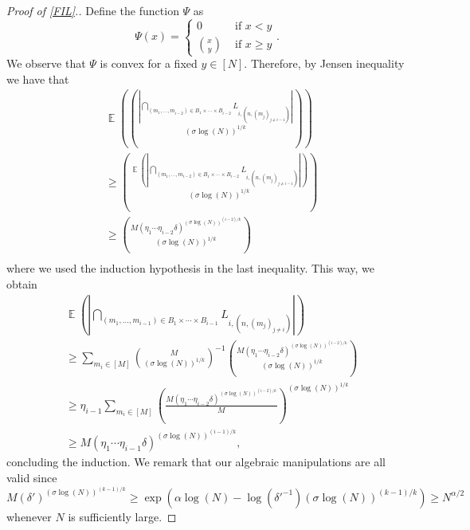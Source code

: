 \documentclass[10pt,a4paper]{amsart}
\newcommand{\E}{\operatorname{\mathbb{E}}}
\begin{document}
\begin{proof}[Proof of \cref{FIL}.]
    Define the function $\Psi$ as
    $$
    \Psi(x) =\begin{cases}
        0 & \text{ if } x<y\\
        \binom{x}{y} & \text{ if }x\geq y
    \end{cases} .
    $$
    We observe that $\Psi$ is convex for a fixed $y\in [N]$. Therefore, by Jensen inequality we have that
    \begin{align*}
        &\E\left( \binom{\left| \bigcap_{(m_1,\ldots,m_{i-2})\in  B_1\times \cdots \times B_{i-2} } L_{i,(n,(m_j)_{j\neq i-1 })} \right|}{(\sigma \log(N))^{1/k}}  \right)\\
        &\geq  \binom{\E\left(\left| \bigcap_{(m_1,\ldots,m_{i-2})\in  B_1\times \cdots \times B_{i-2} } L_{i,(n,(m_j)_{j\neq i-1 })} \right| \right)}{(\sigma \log(N))^{1/k}} \\
        &\geq  \binom{M (\eta_1\cdots\eta_{i-2}\delta)^{(\sigma \log(N))^{(i-2)/k}}}{(\sigma \log(N))^{1/k}} \\
    \end{align*}
    where we used the induction hypothesis in the last inequality. This way, we obtain 
    \begin{align*}
        &\E\left( \left| \bigcap_{(m_1,\ldots,m_{i-1})\in  B_1\times \cdots \times B_{i-1} } L_{i,(n,(m_j)_{j\neq i })} \right| \right) \\
        &\geq  \sum_{m_i\in [M]} \binom{M}{(\sigma \log(N))^{1/k}}^{-1}\binom{M (\eta_1\cdots\eta_{i-2}\delta)^{(\sigma \log(N))^{(i-2)/k}}}{(\sigma \log(N))^{1/k}}\\
        &\geq \eta_{i-1} \sum_{m_i\in [M]} \left(\frac{M (\eta_1\cdots\eta_{i-2}\delta)^{(\sigma \log(N))^{(i-2)/k}}}{M} \right)^{(\sigma \log(N))^{1/k}}\\
        &\geq M (\eta_1\cdots\eta_{i-1}\delta)^{(\sigma \log(N))^{(i-1)/k}},
    \end{align*}
    concluding the induction. We remark that our algebraic manipulations are all valid since $M (\delta')^{(\sigma \log(N))^{(k-1)/k}}\geq\exp(\alpha \log(N)- \log(\delta'^{-1}) (\sigma\log(N))^{(k-1)/k})\geq N^{\alpha/2}$ whenever $N$ is sufficiently large.
    

\end{proof}
\end{document}
